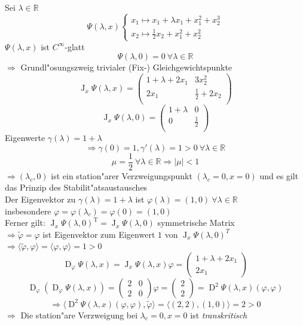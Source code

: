\documentclass[a4paper, 13pt]{scrreprt}
\theoremstyle{definition} \newtheorem{definition}{Definition}[section]
\newenvironment{beispiel}[1][Beispiel]{\begin{trivlist}
\item[\hskip \labelsep {\bfseries #1}]}{\end{trivlist}}
\begin{document}
\begin{beispiel}
Sei $\lambda\in\mathbb{R}$
\[\Psi(\lambda,x) \begin{cases}
x_1\mapsto x_1+\lambda x_1+x_1^2+x_2^3\\
x_2\mapsto \frac 1 2 x_2+x_1^2+x_2^2
\end{cases}\]
$\Psi(\lambda,x)$ ist $C^{\infty}$-glatt\\
\[\Psi(\lambda,0)=0\ \forall\lambda\in\mathbb{R}\]
$\Rightarrow$ Grundl"osungszweig trivialer (Fix-) Gleichgewichtspunkte\\
\[\operatorname{J}_x\Psi(\lambda,x)=\begin{pmatrix}
1+\lambda+2x_1 & 3x_2^2\\
2x_1 & \frac 1 2 +2x_2\\
\end{pmatrix}\]
\[\operatorname{J}_x\Psi(\lambda,0)=\begin{pmatrix}
1+\lambda & 0\\
0 & \frac 1 2\\
\end{pmatrix}\]
Eigenwerte $\gamma(\lambda)=1+\lambda$
\[\Rightarrow \gamma(0)=1, \gamma'(\lambda)=1>0\ \forall \lambda\in\mathbb{R}\]
\[\mu=\frac 1 2\ \forall \lambda\in\mathbb{R} \Rightarrow |\mu|<1\]
$\Rightarrow (\lambda_c,0)$ ist ein station"arer Verzweigungspunkt $(\lambda_c =0, x=0)$ und es gilt das Prinzip des Stabilit"atsaustausches\\
Der Eigenvektor zu $\gamma(\lambda)=1+\lambda$ ist $\varphi(\lambda)=(1,0)\ \forall \lambda\in\mathbb{R}$\\
insbesondere $\varphi =\varphi(\lambda_c)=\varphi(0)=(1,0)$\\
Ferner gilt: $\operatorname{J}_x\Psi(\lambda,0)^{\operatorname{T}}=\operatorname{J}_x\Psi(\lambda,0)$ symmetrische Matrix\\
$\Rightarrow \tilde{\varphi}=\varphi$ ist Eigenvektor zum Eigenwert $1$ von $\operatorname{J}_x\Psi(\lambda,0)^T$\\
$\Rightarrow \langle\tilde{\varphi},\varphi\rangle=\langle\varphi,\varphi\rangle =1>0$
\[\operatorname{D}_{\varphi}\Psi(\lambda,x)=\operatorname{J}_x\Psi(\lambda,x)\varphi=\begin{pmatrix}1+\lambda+2x_1\\ 2x_1 \end{pmatrix}\]
\[\operatorname{D}_{\varphi}(\operatorname{D}_{\varphi}\Psi(\lambda,x))=\begin{pmatrix}2 & 0\\ 2& 0\end{pmatrix}\varphi =\begin{pmatrix}2 \\ 2 \end{pmatrix} =\operatorname{D}^2\Psi(\lambda,x)(\varphi,\varphi)\]
\[\Rightarrow \langle \operatorname{D}^2 \Psi(\lambda,x)(\varphi,\varphi),\tilde{\varphi}\rangle =\langle (2,2),(1,0)\rangle=2>0
\]
$\Rightarrow$ Die station"are Verzweigung bei $\lambda_c=0, x=0$ ist \emph{transkritisch}
\end{beispiel}
\end{document}
